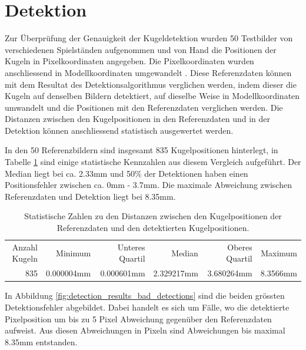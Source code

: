 \section{Detektion}
Zur Überprüfung der Genauigkeit der Kugeldetektion wurden 50 Testbilder von verschiedenen Spielständen aufgenommen
und von Hand die Positionen der Kugeln in Pixelkoordinaten angegeben.
Die Pixelkoordinaten wurden anschliessend in Modellkoordinaten umgewandelt \cite{project2:pixel_to_model_coordinates}.
Diese Referenzdaten können mit dem Resultat des Detektionsalgorithmus verglichen werden,
indem dieser die Kugeln auf denselben Bildern detektiert, auf dieselbe Weise in Modellkoordinaten umwandelt und
die Positionen mit den Referenzdaten verglichen werden.
Die Distanzen zwischen den Kugelpositionen in den Referenzdaten und in der Detektion können
anschliessend statistisch ausgewertet werden.

In den 50 Referenzbildern sind insgesamt 835 Kugelpositionen hinterlegt, in Tabelle \ref{tab:detektion_resultate_distanzen_stats}
sind einige statistische Kennzahlen aus diesem Vergleich aufgeführt. Der Median liegt bei ca. 2.33mm und 50\% der Detektionen
haben einen Positionsfehler zwischen ca. 0mm - 3.7mm. Die maximale Abweichung zwischen Referenzdaten und Detektion liegt bei 8.35mm.

\begin{table}[ht]
    \begin{tabular}{ rrrrrr }
        \rowcolor{\seccolor!50}
        Anzahl Kugeln & Minimum & Unteres Quartil & Median & Oberes Quartil & Maximum\\
        835 & 0.000004mm & 0.000601mm & 2.329217mm & 3.680264mm & 8.3566mm
    \end{tabular}
    \caption{Statistische Zahlen zu den Distanzen zwischen den Kugelpositionen der Referenzdaten und den detektierten Kugelpositionen.}
    \label{tab:detektion_resultate_distanzen_stats}
\end{table}


In Abbildung \ref{fig:detection_results_bad_detections} sind die beiden grössten Detektionsfehler abgebildet.
Dabei handelt es sich um Fälle, wo die detektierte Pixelposition um bis zu 5 Pixel Abweichung gegenüber den Referenzdaten aufweist.
Aus diesen Abweichungen in Pixeln sind Abweichungen bis maximal 8.35mm entstanden.

